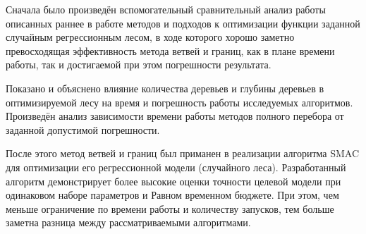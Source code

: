 \chapterconclusion{}

Сначала было произведён вспомогательный сравнительный анализ работы описанных
раннее в работе методов и подходов к оптимизации функции заданной случайным
регрессионным лесом, в ходе которого хорошо заметно превосходящая эффективность
метода ветвей и границ, как в плане времени работы, так и достигаемой при этом
погрешности результата.

Показано и объяснено влияние количества деревьев и глубины деревьев
в оптимизируемой лесу на время и погрешность работы исследуемых алгоритмов.
Произведён анализ зависимости времени работы методов полного перебора от
заданной допустимой погрешности.

После этого метод ветвей и границ был приманен в реализации алгоритма SMAC для
оптимизации его регрессионной модели (случайного леса). Разработанный алгоритм
демонстрирует более высокие оценки точности целевой модели при одинаковом наборе
параметров и Равном временном бюджете. При этом, чем меньше ограничение по
времени работы и количеству запусков, тем больше заметна разница между
рассматриваемыми алгоритмами.
